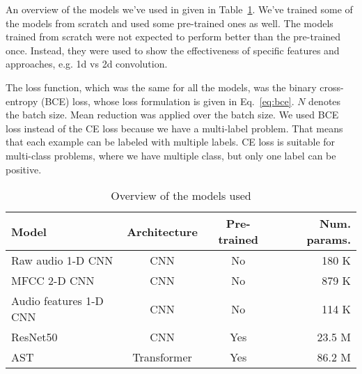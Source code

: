 \label{ch:modeling}

An overview of the models we've used in given in Table~\ref{tab:models-overview}. We've trained some of the models from scratch and used some pre-trained ones as well. The models trained from scratch were not expected to perform better than the pre-trained once. Instead, they were used to show the effectiveness of specific features and approaches, e.g. 1d vs 2d convolution. 

\EQbce

The loss function, which was the same for all the models, was the binary cross-entropy (BCE) loss, whose loss formulation is given in Eq.~\ref{eq:bce}. $N$ denotes the batch size. Mean reduction was applied over the batch size. We used BCE loss instead of the CE loss because we have a multi-label problem. That means that each example can be labeled with multiple labels. CE loss is suitable for multi-class problems, where we have multiple class, but only one label can be positive.

\begin{table}[H]
\centering
\begin{tabular}{l c c r}
Model & Architecture & Pre-trained & Num. params.   \\ \hline
Raw audio 1-D CNN & CNN & No & 180 K                      \\
MFCC 2-D CNN & CNN & No & 879 K                      \\
Audio features 1-D CNN & CNN & No & 114 K                      \\
ResNet50 & CNN & Yes & 23.5 M                     \\
AST & Transformer & Yes & 86.2 M                                             
\end{tabular}
\caption{Overview of the models used}
\label{tab:models-overview}
\end{table}


